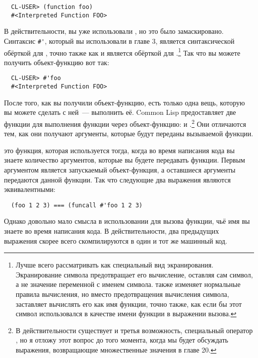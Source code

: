 \begin{verbatim}
  CL-USER> (function foo)
  #<Interpreted Function FOO>
\end{verbatim}

В действительности, вы уже использовали , но это было
замаскировано. Синтаксис \lstinline!#'!, который вы использовали в главе 3, является
синтаксической обёрткой для , точно также как и  является обёрткой
для .\footnote{Лучше всего рассматривать  как специальный вид
  экранирования.  Экранирование символа предотвращает его вычисление, оставляя сам символ,
  а не значение переменной с именем символа.  также изменяет нормальные
  правила вычисления, но вместо предотвращения вычисления символа, заставляет вычислять
  его как имя функции, точно также, как если бы этот символ использовался в качестве имени
  функции в выражении вызова.}  Так что вы можете получить объект-функцию вот так:

\begin{verbatim}
  CL-USER> #'foo
  #<Interpreted Function FOO>
\end{verbatim}

После того, как вы получили объект-функцию, есть только одна вещь, которую вы можете
сделать с ней~--- выполнить её. Common Lisp предоставляет две функции для выполнения
функции через объект-функцию:  и .\footnote{В действительности
  существует и третья возможность, специальный оператор , но я
  отложу этот вопрос до того момента, когда мы будет обсуждать выражения, возвращающие
  множественные значения в главе 20.} Они отличаются тем, как они получают аргументы,
которые будут переданы вызываемой функции.

 это функция, которая используется тогда, когда во время написания кода вы
знаете количество аргументов, которые вы будете передавать функции.  Первым аргументом
 является запускаемый объект-функция, а оставшиеся аргументы передаются
данной функции.  Так что следующие два выражения являются эквивалентными:

\begin{verbatim}
  (foo 1 2 3) === (funcall #'foo 1 2 3)
\end{verbatim}

Однако довольно мало смысла в использовании  для вызова функции, чьё имя вы
знаете во время написания кода.  В действительности, два предыдущих выражения скорее всего
скомпилируются в один и тот же машинный код.

